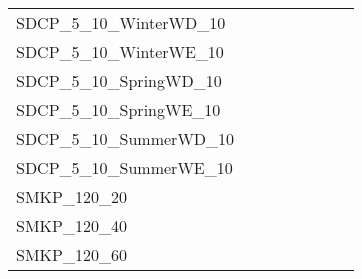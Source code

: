 \begin{table}[H]
{\begin{tabular}{|l|ll|ll|l|l|l|}
			SDCP\_5\_10\_WinterWD\_10      &                                 &                                &                                  &                                 &                                    &                            &                            \\
			SDCP\_5\_10\_WinterWE\_10      &                                 &                                &                                  &                                 &                                    &                            &                            \\
			SDCP\_5\_10\_SpringWD\_10      &                                 &                                &                                  &                                 &                                    &                            &                            \\
			SDCP\_5\_10\_SpringWE\_10      &                                 &                                &                                  &                                 &                                    &                            &                            \\
			SDCP\_5\_10\_SummerWD\_10      &                                 &                                &                                  &                                 &                                    &                            &                            \\
			SDCP\_5\_10\_SummerWE\_10      &                                 &                                &                                  &                                 &                                    &                            &                            \\ \hline
			SMKP\_120\_20                  &                                 &                                &                                  &                                 &                                    &                            &                            \\
			SMKP\_120\_40                  &                                 &                                &                                  &                                 &                                    &                            &                            \\
			SMKP\_120\_60                  &                                 &                                &                                  &                                 &                                    &                            &                            \\

\end{tabular}}
\end{table}
